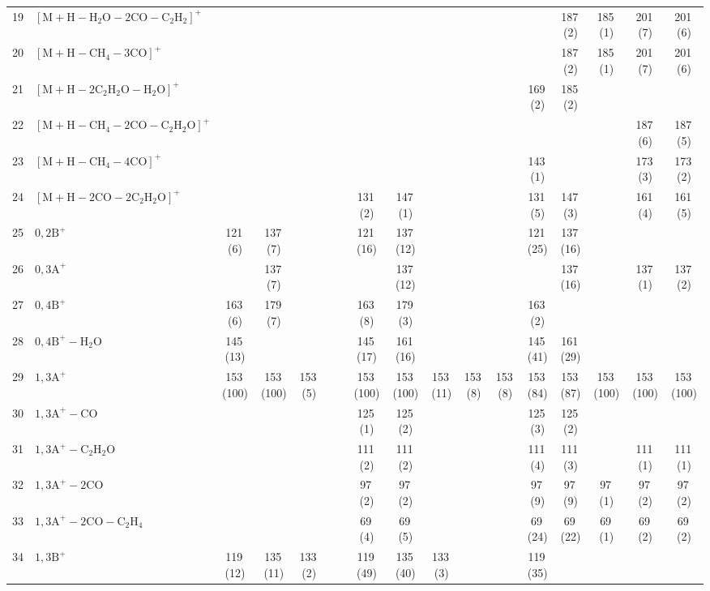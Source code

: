 \documentclass[]{article}
\begin{document}
\begin{table}
{\begin{tabular}{ll|ccccc|ccccc|ccccc}
  19 & $\mathrm{[M{+}H{-}H_{2}O{-}2CO{-}C_{2}H_{2}]^+}$ &  &  &  &  &  &  &  &  &  &  &  & 187\,(2) & 185\,(1) & 201\,(7) & 201\,(6) \\ 
  20 & $\mathrm{[M{+}H{-}CH_{4}{-}3CO]^+}$ &  &  &  &  &  &  &  &  &  &  &  & 187\,(2) & 185\,(1) & 201\,(7) & 201\,(6) \\ 
  21 & $\mathrm{[M{+}H{-}2C_{2}H_{2}O{-}H_{2}O]^+}$ &  &  &  &  &  &  &  &  &  &  & 169\,(2) & 185\,(2) &  &  &  \\ 
  22 & $\mathrm{[M{+}H{-}CH_{4}{-}2CO{-}C_{2}H_{2}O]^+}$ &  &  &  &  &  &  &  &  &  &  &  &  &  & 187\,(6) & 187\,(5) \\ 
  23 & $\mathrm{[M{+}H{-}CH_{4}{-}4CO]^+}$ &  &  &  &  &  &  &  &  &  &  & 143\,(1) &  &  & 173\,(3) & 173\,(2) \\ 
  24 & $\mathrm{[M{+}H{-}2CO{-}2C_{2}H_{2}O]^+}$ &  &  &  &  &  & 131\,(2) & 147\,(1) &  &  &  & 131\,(5) & 147\,(3) &  & 161\,(4) & 161\,(5) \\ 
  25 & $\mathrm{0{,}2B^+}$ & 121\,(6) & 137\,(7) &  &  &  & 121\,(16) & 137\,(12) &  &  &  & 121\,(25) & 137\,(16) &  &  &  \\ 
  26 & $\mathrm{0{,}3A^+}$ &  & 137\,(7) &  &  &  &  & 137\,(12) &  &  &  &  & 137\,(16) &  & 137\,(1) & 137\,(2) \\ 
  27 & $\mathrm{0{,}4B^+}$ & 163\,(6) & 179\,(7) &  &  &  & 163\,(8) & 179\,(3) &  &  &  & 163\,(2) &  &  &  &  \\ 
  28 & $\mathrm{0{,}4B^+{-}H_{2}O}$ & 145\,(13) &  &  &  &  & 145\,(17) & 161\,(16) &  &  &  & 145\,(41) & 161\,(29) &  &  &  \\ 
  29 & $\mathrm{1{,}3A^+}$ & 153\,(100) & 153\,(100) & 153\,(5) &  &  & 153\,(100) & 153\,(100) & 153\,(11) & 153\,(8) & 153\,(8) & 153\,(84) & 153\,(87) & 153\,(100) & 153\,(100) & 153\,(100) \\ 
  30 & $\mathrm{1{,}3A^+{-}CO}$ &  &  &  &  &  & 125\,(1) & 125\,(2) &  &  &  & 125\,(3) & 125\,(2) &  &  &  \\ 
  31 & $\mathrm{1{,}3A^+{-}C_{2}H_{2}O}$ &  &  &  &  &  & 111\,(2) & 111\,(2) &  &  &  & 111\,(4) & 111\,(3) &  & 111\,(1) & 111\,(1) \\ 
  32 & $\mathrm{1{,}3A^+{-}2CO}$ &  &  &  &  &  & 97\,(2) & 97\,(2) &  &  &  & 97\,(9) & 97\,(9) & 97\,(1) & 97\,(2) & 97\,(2) \\ 
  33 & $\mathrm{1{,}3A^+{-}2CO{-}C_{2}H_{4}}$ &  &  &  &  &  & 69\,(4) & 69\,(5) &  &  &  & 69\,(24) & 69\,(22) & 69\,(1) & 69\,(2) & 69\,(2) \\ 
  34 & $\mathrm{1{,}3B^+}$ & 119\,(12) & 135\,(11) & 133\,(2) &  &  & 119\,(49) & 135\,(40) & 133\,(3) &  &  & 119\,(35) &  &  &  &  \\ 

\end{tabular}}
\end{table}
\end{document}
